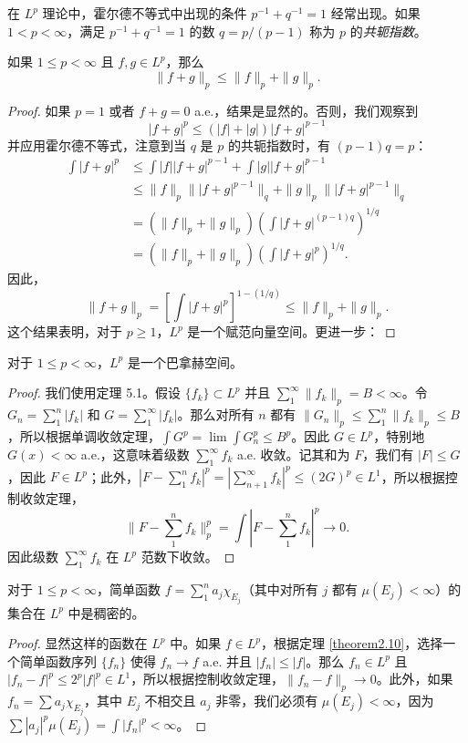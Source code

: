 \documentclass[lang=cn,10pt,thmcnt=section]{elegantbook}
\begin{document}
在 $L^p$ 理论中，霍尔德不等式中出现的条件 $p^{-1}+q^{-1}=1$ 经常出现。如果 $1 < p < \infty$，满足 $p^{-1}+q^{-1}=1$ 的数 $q=p/(p-1)$ 称为 $p$ 的\emph{共轭指数}。

\begin{theorem}[闵可夫斯基不等式]\label{theorem6.5}
如果 $1 \le p < \infty$ 且 $f,g \in L^p$，那么
\[ \|f+g\|_p \le \|f\|_p + \|g\|_p. \]
\end{theorem}

\begin{proof}
如果 $p=1$ 或者 $f+g=0$ a.e.，结果是显然的。否则，我们观察到
\[ |f+g|^p \le (|f|+|g|)|f+g|^{p-1} \]
并应用霍尔德不等式，注意到当 $q$ 是 $p$ 的共轭指数时，有 $(p-1)q=p$：
\begin{align*}
\int |f+g|^p &\le \int |f||f+g|^{p-1} + \int |g||f+g|^{p-1} \\
&\le \|f\|_p \||f+g|^{p-1}\|_q + \|g\|_p \||f+g|^{p-1}\|_q \\
&= (\|f\|_p+\|g\|_p) \left( \int |f+g|^{(p-1)q} \right)^{1/q} \\
&= (\|f\|_p+\|g\|_p) \left( \int |f+g|^p \right)^{1/q}.
\end{align*}
因此，
\[ \|f+g\|_p = \left[ \int |f+g|^p \right]^{1-(1/q)} \le \|f\|_p + \|g\|_p. \]
这个结果表明，对于 $p \ge 1$，$L^p$ 是一个赋范向量空间。更进一步：
\end{proof}

\begin{theorem}\label{theorem6.6}
对于 $1 \le p < \infty$，$L^p$ 是一个巴拿赫空间。
\end{theorem}
\begin{proof}
我们使用定理 5.1。假设 $\{f_k\} \subset L^p$ 并且 $\sum_1^\infty \|f_k\|_p = B < \infty$。令 $G_n = \sum_1^n |f_k|$ 和 $G = \sum_1^\infty |f_k|$。那么对所有 $n$ 都有 $\|G_n\|_p \le \sum_1^n \|f_k\|_p \le B$，所以根据单调收敛定理，$\int G^p = \lim \int G_n^p \le B^p$。因此 $G \in L^p$，特别地 $G(x) < \infty$ a.e.，这意味着级数 $\sum_1^\infty f_k$ a.e. 收敛。记其和为 $F$，我们有 $|F| \le G$，因此 $F \in L^p$；此外，$|F - \sum_1^n f_k|^p = |\sum_{n+1}^\infty f_k|^p \le (2G)^p \in L^1$，所以根据控制收敛定理，
\[ \|F - \sum_1^n f_k\|_p^p = \int |F - \sum_1^n f_k|^p \to 0. \]
因此级数 $\sum_1^\infty f_k$ 在 $L^p$ 范数下收敛。
\end{proof}

\begin{proposition}\label{prop6.7}
对于 $1 \le p < \infty$，简单函数 $f=\sum_1^n a_j \chi_{E_j}$（其中对所有 $j$ 都有 $\mu(E_j) < \infty$）的集合在 $L^p$ 中是稠密的。
\end{proposition}
\begin{proof}
显然这样的函数在 $L^p$ 中。如果 $f \in L^p$，根据定理 \ref{theorem2.10}，选择一个简单函数序列 $\{f_n\}$ 使得 $f_n \to f$ a.e. 并且 $|f_n| \le |f|$。那么 $f_n \in L^p$ 且 $|f_n - f|^p \le 2^p |f|^p \in L^1$，所以根据控制收敛定理，$\|f_n - f\|_p \to 0$。此外，如果 $f_n = \sum a_j \chi_{E_j}$，其中 $E_j$ 不相交且 $a_j$ 非零，我们必须有 $\mu(E_j) < \infty$，因为 $\sum |a_j|^p \mu(E_j) = \int |f_n|^p < \infty$。
\end{proof}
\end{document}
